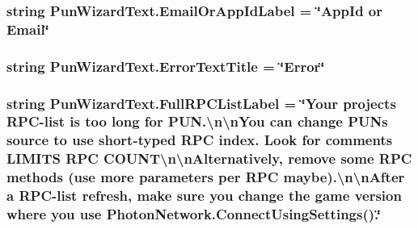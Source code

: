 \subsubsection[{\texorpdfstring{Email\+Or\+App\+Id\+Label}{EmailOrAppIdLabel}}]{\setlength{\rightskip}{0pt plus 5cm}string Pun\+Wizard\+Text.\+Email\+Or\+App\+Id\+Label = \char`\"{}App\+Id or Email\char`\"{}}\hypertarget{class_pun_wizard_text_a9f3b6fe2361497a670199d682e99575b}{}\label{class_pun_wizard_text_a9f3b6fe2361497a670199d682e99575b}
\subsubsection[{\texorpdfstring{Error\+Text\+Title}{ErrorTextTitle}}]{\setlength{\rightskip}{0pt plus 5cm}string Pun\+Wizard\+Text.\+Error\+Text\+Title = \char`\"{}Error\char`\"{}}\hypertarget{class_pun_wizard_text_aa84cb016d8a443bb42ec4d0c36661ef4}{}\label{class_pun_wizard_text_aa84cb016d8a443bb42ec4d0c36661ef4}
\subsubsection[{\texorpdfstring{Full\+R\+P\+C\+List\+Label}{FullRPCListLabel}}]{\setlength{\rightskip}{0pt plus 5cm}string Pun\+Wizard\+Text.\+Full\+R\+P\+C\+List\+Label = \char`\"{}Your project\textquotesingle{}s R\+PC-\/list is too long for P\+U\+N.\textbackslash{}n\textbackslash{}n\+You can change P\+UN\textquotesingle{}s source to use short-\/typed R\+PC index. Look for comments \textquotesingle{}L\+I\+M\+I\+TS R\+PC C\+O\+U\+NT\textquotesingle{}\textbackslash{}n\textbackslash{}n\+Alternatively, remove some R\+PC methods (use more parameters per R\+PC maybe).\textbackslash{}n\textbackslash{}n\+After a R\+PC-\/list refresh, make sure you change the game version where you use {\bf Photon\+Network.\+Connect\+Using\+Settings}().\char`\"{}}\hypertarget{class_pun_wizard_text_a304fd8e76cdaba433a5838962201f4f7}{}\label{class_pun_wizard_text_a304fd8e76cdaba433a5838962201f4f7}
